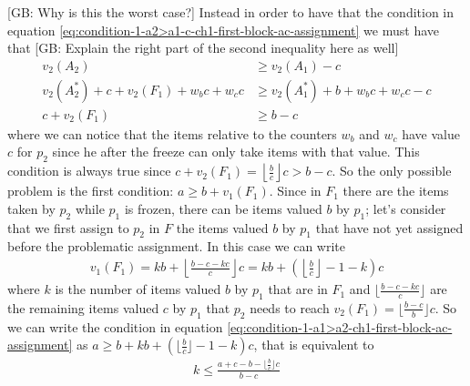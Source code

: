 \documentclass{article}
\newcommand{\gb}[1]{{\color{red}[GB: #1]}}
\begin{document}
\gb{Why is this the worst case?}
Instead in order to have that the condition in equation \ref{eq:condition-1-a2>a1-c-ch1-first-block-ac-assignment} we must have that
\gb{Explain the right part of the second inequality here as well}
\begin{align*}
    v_2(A_2) &\ge v_2(A_1) -c\\
    v_2(A_2^*) + c + v_2(F_1)+ w_b c + w_c c &\ge v_2(A_1^*) + b + w_b c + w_c c - c\\
    c  + v_2(F_1)&\ge  b - c 
\end{align*}
where we can notice that the items relative to the counters $w_b$ and $w_c$ have value $c$ for $p_2$ since he after the freeze can only take items with that value.
This condition is always true since $ c  + v_2(F_1) =\left \lfloor \frac{b}{c}\right\rfloor c > b-c$. So the only possible problem is the first condition: $a \ge  b + v_1(F_1)$. Since in $F_1$ there are the items taken by $p_2$ while $p_1$ is frozen, there can be items valued $b$ by $p_1$; let's consider that we first assign to $p_2$ in $F$ the items valued $b$ by $p_1$ that have not yet assigned before the problematic assignment. In this case we can write
\begin{align*}
    v_1(F_1) = kb + \left\lfloor \frac{b-c-kc}{c}\right\rfloor c = kb + (\left\lfloor \frac{b}{c}\right\rfloor -1-k)c
\end{align*}
where $k$ is the number of items valued $b$ by $p_1$ that are in $F_1$ and $\lfloor \frac{b-c-kc}{c}\rfloor$ are the remaining items valued $c$ by $p_1$ that $p_2$ needs to reach $v_2(F_1)  = \lfloor \frac{b-c}{b}\rfloor c$. So we can write the condition in equation \ref{eq:condition-1-a1>a2-ch1-first-block-ac-assignment} as $a \ge b +kb + (\lfloor \frac{b}{c}\rfloor -1-k)c $, that is equivalent to 
\begin{align}
    k \le \frac{a + c - b - \lfloor \frac{b}{c}\rfloor c }{b-c}
    \label{eq:condition-1-a1>a2-ch1-first-block-ac-assignment-on-k}
\end{align}
\end{document}
